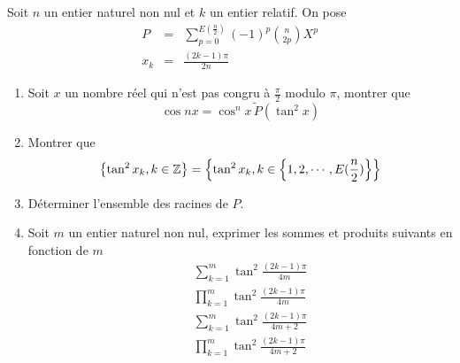 Soit $n$ un entier naturel non nul et $k$ un entier relatif. On
pose
\begin{eqnarray*}
P &=&\sum_{p=0}^{E(\frac{n}{2})}(-1)^{p}\binom{n}{2p}X^{p} \\
x_{k} &=&\frac{(2k-1)\pi }{2n}
\end{eqnarray*}

\begin{enumerate}
\item  Soit $x$ un nombre r{\'e}el qui n'est pas congru {\`a} $\frac{\pi }{2}
$ modulo $\pi $, montrer que
\[
\cos nx=\cos ^{n}x\widetilde{\,P}(\tan ^{2}x)
\]

\item  Montrer que
\[
\left\{ \tan ^{2}x_{k},k\in \mathbb{Z}\right\} =\left\{ \tan
^{2}x_{k},k\in \left\{ 1,2,\cdots ,E(\frac{n}{2})\right\} \right\}
\]

\item  D{\'e}terminer l'ensemble des racines de $P$.

\item  Soit $m$ un entier naturel non nul, exprimer les sommes et produits
suivants en fonction de $m$%
\begin{eqnarray*}
&&\sum_{k=1}^{m}\tan ^{2}\frac{(2k-1)\pi }{4m} \\
&&\prod_{k=1}^{m}\tan ^{2}\frac{(2k-1)\pi }{4m} \\
&&\sum_{k=1}^{m}\tan ^{2}\frac{(2k-1)\pi }{4m+2} \\
&&\prod_{k=1}^{m}\tan ^{2}\frac{(2k-1)\pi }{4m+2}
\end{eqnarray*}
\end{enumerate}
